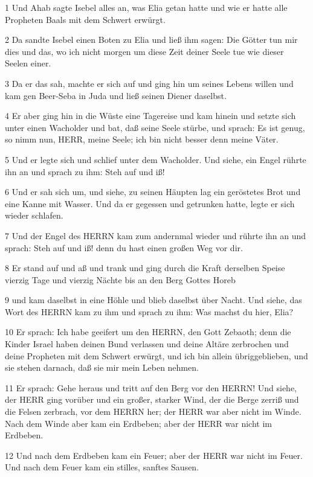 \par 1 Und Ahab sagte Isebel alles an, was Elia getan hatte und wie er hatte alle Propheten Baals mit dem Schwert erwürgt.
\par 2 Da sandte Isebel einen Boten zu Elia und ließ ihm sagen: Die Götter tun mir dies und das, wo ich nicht morgen um diese Zeit deiner Seele tue wie dieser Seelen einer.
\par 3 Da er das sah, machte er sich auf und ging hin um seines Lebens willen und kam gen Beer-Seba in Juda und ließ seinen Diener daselbst.
\par 4 Er aber ging hin in die Wüste eine Tagereise und kam hinein und setzte sich unter einen Wacholder und bat, daß seine Seele stürbe, und sprach: Es ist genug, so nimm nun, HERR, meine Seele; ich bin nicht besser denn meine Väter.
\par 5 Und er legte sich und schlief unter dem Wacholder. Und siehe, ein Engel rührte ihn an und sprach zu ihm: Steh auf und iß!
\par 6 Und er sah sich um, und siehe, zu seinen Häupten lag ein geröstetes Brot und eine Kanne mit Wasser. Und da er gegessen und getrunken hatte, legte er sich wieder schlafen.
\par 7 Und der Engel des HERRN kam zum andernmal wieder und rührte ihn an und sprach: Steh auf und iß! denn du hast einen großen Weg vor dir.
\par 8 Er stand auf und aß und trank und ging durch die Kraft derselben Speise vierzig Tage und vierzig Nächte bis an den Berg Gottes Horeb
\par 9 und kam daselbst in eine Höhle und blieb daselbst über Nacht. Und siehe, das Wort des HERRN kam zu ihm und sprach zu ihm: Was machst du hier, Elia?
\par 10 Er sprach: Ich habe geeifert um den HERRN, den Gott Zebaoth; denn die Kinder Israel haben deinen Bund verlassen und deine Altäre zerbrochen und deine Propheten mit dem Schwert erwürgt, und ich bin allein übriggeblieben, und sie stehen darnach, daß sie mir mein Leben nehmen.
\par 11 Er sprach: Gehe heraus und tritt auf den Berg vor den HERRN! Und siehe, der HERR ging vorüber und ein großer, starker Wind, der die Berge zerriß und die Felsen zerbrach, vor dem HERRN her; der HERR war aber nicht im Winde. Nach dem Winde aber kam ein Erdbeben; aber der HERR war nicht im Erdbeben.
\par 12 Und nach dem Erdbeben kam ein Feuer; aber der HERR war nicht im Feuer. Und nach dem Feuer kam ein stilles, sanftes Sausen.
